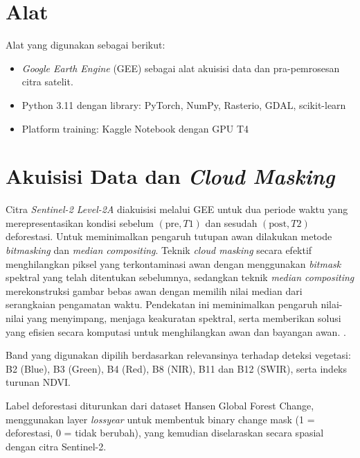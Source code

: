 \section{Alat}

Alat yang digunakan sebagai berikut:
\begin{itemize}[]
	\item \textit{Google Earth Engine} (GEE) sebagai alat akuisisi data dan pra-pemrosesan citra satelit.
	\item Python 3.11 dengan library: PyTorch, NumPy, Rasterio, GDAL, scikit-learn
	\item Platform training: Kaggle Notebook dengan GPU T4
\end{itemize}


\section{Akuisisi Data dan \textit{Cloud Masking}}

Citra \textit{Sentinel-2 Level-2A} diakuisisi melalui GEE untuk dua periode waktu yang merepresentasikan kondisi sebelum $(\text{pre}, T1)$ dan sesudah $(\text{post}, T2)$ deforestasi. Untuk meminimalkan pengaruh tutupan awan dilakukan metode \textit{bitmasking} dan \textit{median compositing}. Teknik \textit{cloud masking} secara efektif menghilangkan piksel yang terkontaminasi awan dengan menggunakan \textit{bitmask} spektral yang telah ditentukan sebelumnya, sedangkan teknik \textit{median compositing} merekonstruksi gambar bebas awan dengan memilih nilai median dari serangkaian pengamatan waktu. Pendekatan ini meminimalkan pengaruh nilai-nilai yang menyimpang, menjaga keakuratan spektral, serta memberikan solusi yang efisien secara komputasi untuk menghilangkan awan dan bayangan awan. \citep{mangroveR2025}.

Band yang digunakan dipilih berdasarkan relevansinya terhadap deteksi vegetasi: B2 (Blue), B3 (Green), B4 (Red), B8 (NIR), B11 dan B12 (SWIR), serta indeks turunan NDVI. 

Label deforestasi diturunkan dari dataset Hansen Global Forest Change, menggunakan layer \textit{lossyear} untuk membentuk binary change mask (1 = deforestasi, 0 = tidak berubah), yang kemudian diselaraskan secara spasial dengan citra Sentinel-2.


